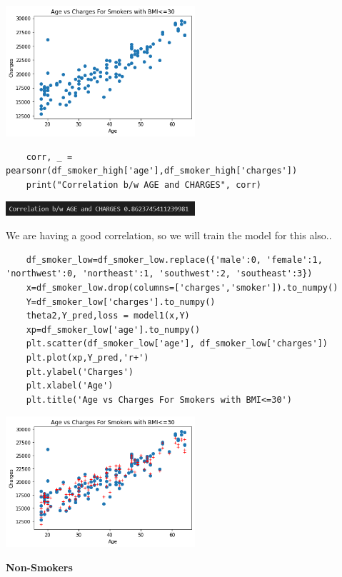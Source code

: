 \documentclass[12pt]{article}
\numberwithin{equation}{section}
\begin{document}
{\begin{lstlisting}
\end{lstlisting}
\begin{center}
\includegraphics[width=7cm]{work12}
\end{center}
\begin{lstlisting}
	corr, _ = pearsonr(df_smoker_high['age'],df_smoker_high['charges'])
	print("Correlation b/w AGE and CHARGES", corr)
\end{lstlisting}
\begin{center}
\includegraphics[width=7cm]{work13}\\
\end{center}
We are having a good correlation, so we will train the model for this also..
\begin{lstlisting}
	df_smoker_low=df_smoker_low.replace({'male':0, 'female':1, 'northwest':0, 'northeast':1, 'southwest':2, 'southeast':3})
	x=df_smoker_low.drop(columns=['charges','smoker']).to_numpy()
	Y=df_smoker_low['charges'].to_numpy()
	theta2,Y_pred,loss = model1(x,Y)
	xp=df_smoker_low['age'].to_numpy()
	plt.scatter(df_smoker_low['age'], df_smoker_low['charges'])
	plt.plot(xp,Y_pred,'r+')
	plt.ylabel('Charges')
	plt.xlabel('Age')
	plt.title('Age vs Charges For Smokers with BMI<=30')
\end{lstlisting}
\begin{center}
\includegraphics[width=7cm]{work14}
\end{center}
\textbf{\large{Non-Smokers}}
\begin{lstlisting}

\end{lstlisting}}
\end{document}
